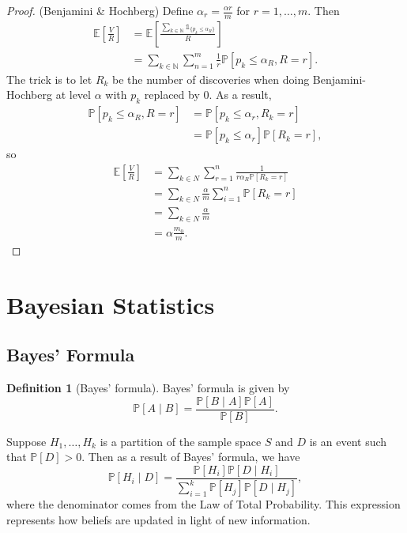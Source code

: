 \documentclass{tufte-handout}
\newcommand*\N{\mathbb{N}}
\newcommand*\E{\mathbb{E}}
\renewcommand{\P}{\mathbb{P}}
\theoremstyle{definition}
\newtheorem{defn}[thm]{Definition}
\begin{document}
\begin{proof}
	(Benjamini \& Hochberg) Define $\alpha_r = \frac{\alpha r}{m}$ for $r = 1,\ldots,m$. Then \begin{align*}
		\E\left[\frac{V}{R}\right] &= \E\left[\frac{\sum\limits_{k \in \N}^{} \mathds{1}_{\{p_k \le \alpha_R\}}}{R}\right] \\
								   &= \sum\limits_{k\in \N}^{} \sum\limits_{n=1}^{m} \frac{1}{r}\P\left[p_k \le \alpha_R ,R = r\right] 
							   .\end{align*}
	The trick is to let $R_k$ be the number of discoveries when doing Benjamini-Hochberg at level $\alpha$ with $p_k$ replaced by $0$.
	As a result,
	\begin{align*}
		\P\left[p_k \le \alpha_R, R = r\right] &= \P\left[p_k \le \alpha_r, R_k = r\right]  \\
		&= \P\left[p_k \le \alpha_r\right] \P\left[R_k = r\right]
	,\end{align*} so 
	\begin{align*}
		\E\left[\frac{V}{R}\right] &= \sum\limits_{k\in N}^{} \sum\limits_{r=1}^{n} \frac{1}{r \alpha_R \P\left[R_k = r\right] }\\
								   &= \sum\limits_{k\in N}^{} \frac{\alpha}{m} \sum\limits_{i=1}^{n} \P\left[R_k = r\right] \\
								   &= \sum\limits_{k \in N}^{} \frac{\alpha}{m} \\
								   &= \alpha \frac{m_0}{m}
	.\end{align*}
\end{proof}

\section{Bayesian Statistics}
\subsection{Bayes' Formula}

\begin{defn}[Bayes' formula]
	Bayes' formula is given by \[
		\P\left[A \mid B\right] = \frac{\P\left[B \mid A\right] \P\left[A\right] }{\P\left[B\right] }
	.\] 	
\end{defn}

Suppose $H_1,\ldots,H_k$ is a partition of the sample space $S$ and $D$ is an event such that $\P\left[D\right] > 0$. Then as a result of Bayes' formula, we have \[
	\P\left[H_i \mid D\right] = \frac{\P\left[H_i\right] \P\left[D \mid H_i\right] }{\sum\limits_{i=1}^{k} \P\left[H_j\right] \P\left[D \mid H_j\right] }
,\] where the denominator comes from the Law of Total Probability. This expression represents how beliefs are updated in light of new information.
\end{document}
